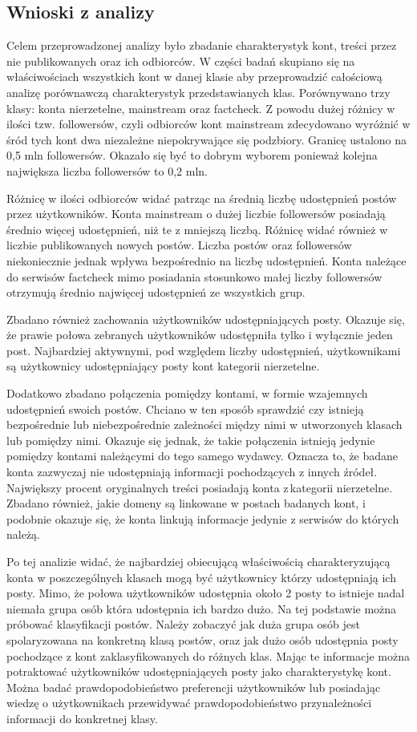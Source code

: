 \subsection{Wnioski z analizy}
Celem przeprowadzonej analizy było zbadanie charakterystyk kont, treści przez nie publikowanych oraz ich odbiorców. W części badań skupiano się na właściwościach wszystkich kont w danej klasie aby przeprowadzić całościową analizę porównawczą charakterystyk przedstawianych klas. Porównywano trzy klasy: konta nierzetelne, mainstream oraz factcheck. Z powodu dużej różnicy w ilości tzw. followersów, czyli odbiorców kont mainstream zdecydowano wyróżnić w śród tych kont dwa niezależne niepokrywające się podzbiory. Granicę ustalono na 0,5 mln followersów. Okazało się być to dobrym wyborem ponieważ kolejna największa liczba followersów to 0,2 mln.  
\par Różnicę w ilości odbiorców widać patrząc na średnią liczbę udostępnień postów przez użytkowników. Konta mainstream o dużej liczbie followersów posiadają średnio więcej udostępnień, niż te z mniejszą liczbą. Różnicę widać również w liczbie publikowanych nowych postów. Liczba postów oraz followersów niekoniecznie jednak wpływa bezpośrednio na liczbę udostępnień. Konta należące do serwisów factcheck mimo posiadania stosunkowo małej liczby followersów otrzymują średnio najwięcej udostępnień ze wszystkich grup.
\par
Zbadano również zachowania użytkowników udostępniających posty. Okazuje się, że prawie połowa zebranych użytkowników udostępniła tylko i wyłącznie jeden post. Najbardziej aktywnymi, pod względem liczby udostępnień, użytkownikami są użytkownicy udostępniający posty kont kategorii nierzetelne.
\par
Dodatkowo zbadano połączenia pomiędzy kontami, w formie wzajemnych udostępnień swoich postów. Chciano w ten sposób sprawdzić czy istnieją bezpośrednie lub niebezpośrednie zależności między nimi w utworzonych klasach lub pomiędzy nimi. Okazuje się jednak, że takie połączenia istnieją jedynie pomiędzy kontami należącymi do tego samego wydawcy. Oznacza to, że badane konta zazwyczaj nie udostępniają informacji pochodzących z innych źródeł. Największy procent oryginalnych treści posiadają konta z\,kategorii nierzetelne.  Zbadano również, jakie domeny są linkowane w postach badanych kont, i podobnie okazuje się, że konta linkują informacje jedynie z serwisów do których należą. 
\par
Po tej analizie widać, że najbardziej obiecującą właściwością charakteryzującą konta w poszczególnych klasach mogą być użytkownicy którzy udostępniają ich posty. Mimo, że połowa użytkowników udostępnia około 2 posty to istnieje  nadal niemała grupa osób która udostępnia ich bardzo dużo. Na tej podstawie można próbować klasyfikacji postów. Należy zobaczyć jak duża grupa osób jest spolaryzowana na konkretną klasą postów, oraz jak dużo osób udostępnia posty pochodzące z kont zaklasyfikowanych do różnych klas. Mając te informacje można potraktować użytkowników udostępniających posty jako charakterystykę kont. Można badać prawdopodobieństwo preferencji użytkowników lub posiadając wiedzę o użytkownikach przewidywać prawdopodobieństwo przynależności informacji do konkretnej klasy. 